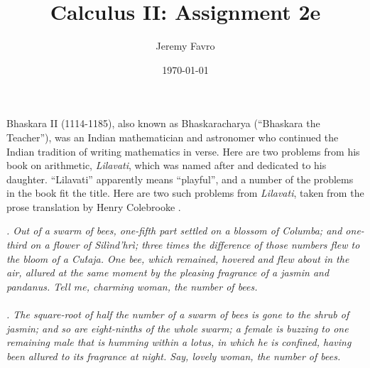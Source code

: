 \documentclass[10pt]{article}
\title{Calculus II: Assignment 2e}
\author{Jeremy Favro}
\date{\today}
\theoremstyle{definition}
\begin{document}
\maketitle

Bhaskara II (1114-1185), also known as Bhaskaracharya (“Bhaskara the
Teacher”), was an Indian mathematician and astronomer who continued the
Indian tradition of writing mathematics in verse. Here are two problems
from his book on arithmetic, \textit{Lilavati}, which was named after and dedicated
to his daughter. “Lilavati” apparently means “playful”, and a number of
the problems in the book fit the title. Here are two such problems from
\textit{Lilavati}, taken from the prose translation by Henry Colebrooke \cite{AAM}.
~\\
\begin{adjustwidth}{75pt}{75pt}
    \textit{
        . Out of a swarm of bees, one-fifth part settled on a blossom
        of Columba; and one-third on a flower of Sil\`ind'hr\`i; three times
        the difference of those numbers flew to the bloom of a Cu\'taja. One
        bee, which remained, hovered and flew about in the air, allured
        at the same moment by the pleasing fragrance of a jasmin and
        pandanus. Tell me, charming woman, the number of bees.
    }
    ~\\~\\
    \textit{
        . The square-root of half the number of a swarm of bees is
        gone to the shrub of jasmin; and so are eight-ninths of the whole
        swarm; a female is buzzing to one remaining male that is humming
        within a lotus, in which he is confined, having been allured to its
        fragrance at night. Say, lovely woman, the number of bees.
    }
\end{adjustwidth}
\end{document}
